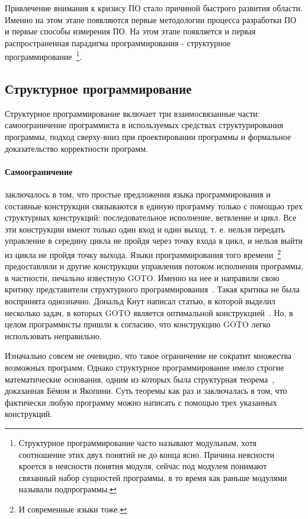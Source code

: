 Привлечение внимания к кризису ПО стало причиной быстрого развития области. Именно на этом этапе появляются первые методологии процесса разработки ПО и первые способы измерения ПО. На этом этапе появляется и первая распространенная парадигма программирования - структурное программирование~\footnote{Структурное программирование часто называют модульным, хотя соотношение этих двух понятий не до конца ясно. Причина неясности кроется в неясности понятия модуля, сейчас под модулем понимают связанный набор сущностей программы, в то время как раньше модулями называли подпрограммы.}.

\subsection{Структурное программирование}

Структурное программирование включает три взаимосвязанные части: самоограничение программиста в используемых средствах структурирования программы, подход сверху-вниз при проектировании программы и формальное доказательство корректности программ.

\paragraph{Самоограничение} заключалось в том, что простые предложения языка программирования и составные конструкции связываются в единую программу только с помощью трех структурных конструкций: последовательное исполнение, ветвление и цикл. Все эти конструкции имеют только один вход и один выход, т. е. нельзя передать управление в середину цикла не пройдя через точку входа в цикл, и нельзя выйти из цикла не пройдя точку выхода. Языки программирования того времени~\footnote{И современные языки тоже.} предоставляли и другие конструкции управления потоком исполнения программы, в частности, печально известную GOTO. Именно на нее и направили свою критику представители структурного программирования~\cite{Dijkstra:1968:LEG}. Такая критика не была воспринята однозначно. Дональд Кнут написал статью, в которой выделил несколько задач, в которых GOTO является оптимальной конструкцией~\cite{Knuth:1974:SPG}. Но, в целом программисты пришли к согласию, что конструкцию GOTO легко использовать неправильно.

Изначально совсем не очевидно, что такое ограничение не сократит множества возможных программ. Однако структурное программирование имело строгие математические основания, одним из которых была структурная теорема~\cite{SPT}, доказанная Бёмом и Якопини. Суть теоремы как раз и заключалась в том, что фактически любую программу можно написать с помощью трех указанных конструкций.

